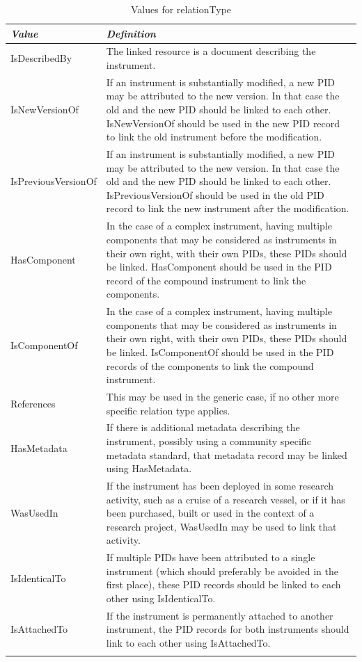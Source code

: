 \documentclass[titlepage=true,twoside=false,DIV=13]{scrartcl}
\begin{document}
\begin{longtable}{|l|p{\valdefcolw}|}
  \hline
  \emph{Value} & \emph{Definition} \\
  \hline \endhead
  \hline \endfoot\endlastfoot
  IsDescribedBy       &
  The linked resource is a document describing the instrument.
  \\ \hline
  IsNewVersionOf      &
  If an instrument is substantially modified, a new PID may be
  attributed to the new version.  In that case the old and the new PID
  should be linked to each other.  IsNewVersionOf should be used in
  the new PID record to link the old instrument before the
  modification.
  \\ \hline
  IsPreviousVersionOf &
  If an instrument is substantially modified, a new PID may be
  attributed to the new version.  In that case the old and the new PID
  should be linked to each other.  IsPreviousVersionOf should be used
  in the old PID record to link the new instrument after the
  modification.
  \\ \hline
  HasComponent        &
  In the case of a complex instrument, having multiple components that
  may be considered as instruments in their own right, with their own
  PIDs, these PIDs should be linked.  HasComponent should be used in
  the PID record of the compound instrument to link the components.
  \\ \hline
  IsComponentOf       &
  In the case of a complex instrument, having multiple components that
  may be considered as instruments in their own right, with their own
  PIDs, these PIDs should be linked.  IsComponentOf should be used in
  the PID records of the components to link the compound instrument.
  \\ \hline
  References          &
  This may be used in the generic case, if no other more specific
  relation type applies.
  \\ \hline
  HasMetadata         &
  If there is additional metadata describing the instrument, possibly
  using a community specific metadata standard, that metadata record
  may be linked using HasMetadata.
  \\ \hline
  WasUsedIn           &
  If the instrument has been deployed in some research activity, such
  as a cruise of a research vessel, or if it has been purchased, built
  or used in the context of a research project, WasUsedIn may be used
  to link that activity.
  \\ \hline
  IsIdenticalTo       &
  If multiple PIDs have been attributed to a single instrument (which
  should preferably be avoided in the first place), these PID records
  should be linked to each other using IsIdenticalTo.
  \\ \hline
  IsAttachedTo        &
  If the instrument is permanently attached to another instrument, the
  PID records for both instruments should link to each other using
  IsAttachedTo.
  \\ \hline
  \caption{Values for relationType}
  \label{tab:schema:values:relationType}
\end{longtable}
\end{document}
